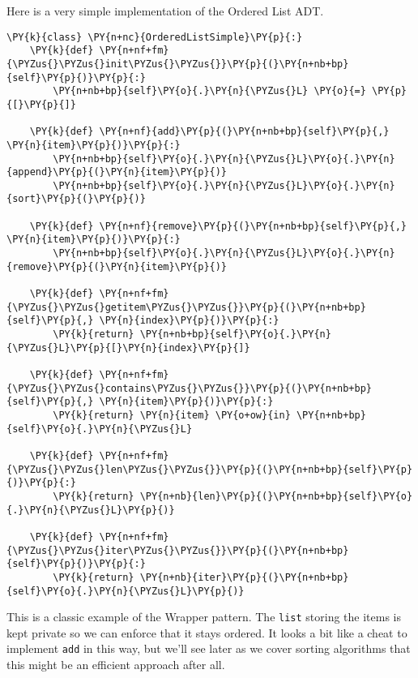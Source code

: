 Here is a very simple implementation of the Ordered List ADT.

\begin{Verbatim}[commandchars=\\\{\}]
\PY{k}{class} \PY{n+nc}{OrderedListSimple}\PY{p}{:}
    \PY{k}{def} \PY{n+nf+fm}{\PYZus{}\PYZus{}init\PYZus{}\PYZus{}}\PY{p}{(}\PY{n+nb+bp}{self}\PY{p}{)}\PY{p}{:}
        \PY{n+nb+bp}{self}\PY{o}{.}\PY{n}{\PYZus{}L} \PY{o}{=} \PY{p}{[}\PY{p}{]}

    \PY{k}{def} \PY{n+nf}{add}\PY{p}{(}\PY{n+nb+bp}{self}\PY{p}{,} \PY{n}{item}\PY{p}{)}\PY{p}{:}
        \PY{n+nb+bp}{self}\PY{o}{.}\PY{n}{\PYZus{}L}\PY{o}{.}\PY{n}{append}\PY{p}{(}\PY{n}{item}\PY{p}{)}
        \PY{n+nb+bp}{self}\PY{o}{.}\PY{n}{\PYZus{}L}\PY{o}{.}\PY{n}{sort}\PY{p}{(}\PY{p}{)}

    \PY{k}{def} \PY{n+nf}{remove}\PY{p}{(}\PY{n+nb+bp}{self}\PY{p}{,} \PY{n}{item}\PY{p}{)}\PY{p}{:}
        \PY{n+nb+bp}{self}\PY{o}{.}\PY{n}{\PYZus{}L}\PY{o}{.}\PY{n}{remove}\PY{p}{(}\PY{n}{item}\PY{p}{)}

    \PY{k}{def} \PY{n+nf+fm}{\PYZus{}\PYZus{}getitem\PYZus{}\PYZus{}}\PY{p}{(}\PY{n+nb+bp}{self}\PY{p}{,} \PY{n}{index}\PY{p}{)}\PY{p}{:}
        \PY{k}{return} \PY{n+nb+bp}{self}\PY{o}{.}\PY{n}{\PYZus{}L}\PY{p}{[}\PY{n}{index}\PY{p}{]}

    \PY{k}{def} \PY{n+nf+fm}{\PYZus{}\PYZus{}contains\PYZus{}\PYZus{}}\PY{p}{(}\PY{n+nb+bp}{self}\PY{p}{,} \PY{n}{item}\PY{p}{)}\PY{p}{:}
        \PY{k}{return} \PY{n}{item} \PY{o+ow}{in} \PY{n+nb+bp}{self}\PY{o}{.}\PY{n}{\PYZus{}L}

    \PY{k}{def} \PY{n+nf+fm}{\PYZus{}\PYZus{}len\PYZus{}\PYZus{}}\PY{p}{(}\PY{n+nb+bp}{self}\PY{p}{)}\PY{p}{:}
        \PY{k}{return} \PY{n+nb}{len}\PY{p}{(}\PY{n+nb+bp}{self}\PY{o}{.}\PY{n}{\PYZus{}L}\PY{p}{)}

    \PY{k}{def} \PY{n+nf+fm}{\PYZus{}\PYZus{}iter\PYZus{}\PYZus{}}\PY{p}{(}\PY{n+nb+bp}{self}\PY{p}{)}\PY{p}{:}
        \PY{k}{return} \PY{n+nb}{iter}\PY{p}{(}\PY{n+nb+bp}{self}\PY{o}{.}\PY{n}{\PYZus{}L}\PY{p}{)}
\end{Verbatim}



This is a classic example of the Wrapper pattern.
The \texttt{list} storing the items is kept private so we can enforce that it stays ordered.
It looks a bit like a cheat to implement \texttt{add} in this way, but we'll see later as we cover sorting algorithms that this might be an efficient approach after all.


